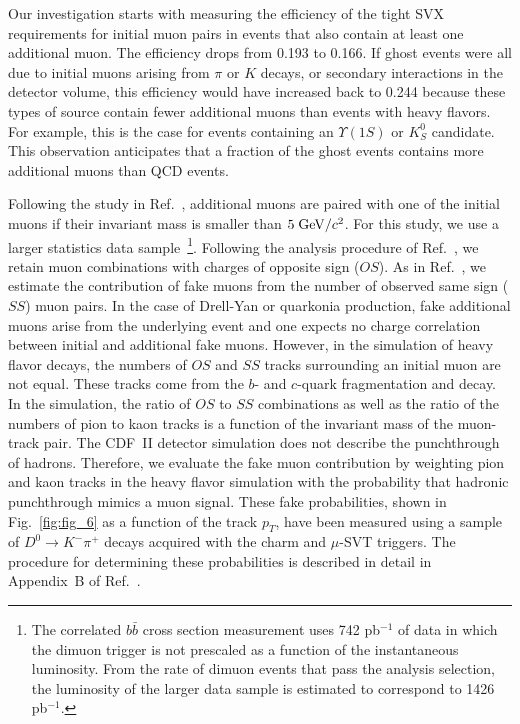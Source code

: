 \documentclass[aps,prd,preprint,floatfix,nofootinbib,superscriptaddress,showpacs,amssymb]{revtex4}
\begin{document}
 
 Our investigation starts with measuring the efficiency of the tight 
 SVX requirements for initial muon pairs in events that also contain
 at least one   additional muon. The efficiency drops from 0.193 to 0.166.
 If ghost events were all due to initial muons arising from $\pi$ or
 $K$ decays, or secondary interactions in the detector volume, this
 efficiency would have increased back to 0.244 because these types of source
 contain fewer additional muons than events with heavy flavors.
 For example, this is the case for events containing an $\Upsilon(1S)$ 
 or $K^0_S$ candidate. This observation anticipates that a fraction of
 the ghost events contains more additional muons than QCD events. 

 
 Following the study in Ref.~\cite{dilb}, additional muons are paired
 with one of the initial muons if their invariant mass is smaller than
 $5 \; {\rm GeV/}c^2$. For this study, we use a larger statistics data
 sample~\footnote{
 The correlated $b\bar{b}$ cross section measurement uses 742 pb$^{-1}$
 of data in which the dimuon trigger is not prescaled as a function of
 the instantaneous luminosity. From the rate of dimuon events that pass
 the analysis selection, the luminosity of the larger data sample is
 estimated to correspond to 1426 pb$^{-1}$.}.
 Following the analysis procedure of Ref.~\cite{dilb}, we retain muon 
 combinations with charges of opposite sign ($OS$). As in Ref.~\cite{dilb},
 we estimate the contribution of fake muons from the number of observed
 same sign ($SS$) muon pairs. In the case of Drell-Yan or quarkonia
 production, fake additional muons arise from the underlying event and
 one expects no charge correlation between initial and additional fake
 muons. However, in the simulation of heavy flavor decays, the numbers of
 $OS$  and $SS$ tracks surrounding an initial muon are not equal. These tracks
 come from the $b$- and $c$-quark fragmentation and decay. In the
 simulation, the ratio of $OS$ to $SS$ combinations as well as the
 ratio of the numbers of pion to kaon tracks is a function of the 
 invariant mass of the muon-track pair. The CDF~II detector simulation  
 does not describe the punchthrough of hadrons. Therefore, we evaluate 
 the fake muon contribution by weighting pion and kaon tracks in the
 heavy flavor simulation with the probability that hadronic punchthrough
 mimics a muon signal. These fake probabilities, shown in Fig.~\ref{fig:fig_6}
 as a function of the track $p_T$, have been measured using a sample
 of $D^0 \rightarrow K^- \pi^+$ decays acquired with the {\sc charm}
 and $\mu$-SVT triggers. The procedure for determining these probabilities
 is described in detail in Appendix~B of Ref.~\cite{bbxs}.
\end{document}
